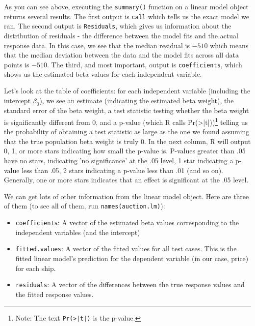 \documentclass{tufte-book}\usepackage[]{graphicx}\usepackage[]{color}
\begin{document}
\begin{footnotesize}
As you can see above, executing the \texttt{summary()} function on a linear model object returns several results. The first output is \texttt{call} which tells us the exact model we ran. The second output is \texttt{Residuals}, which gives us information about the distribution of residuals - the difference between the model fits and the actual response data. In this case, we see that the median residual is \ensuremath{-510} which means that the median deviation between the data and the model fits across all data points is \ensuremath{-510}. The third, and most important, output is \texttt{coefficients}, which shows us the estimated beta values for each independent variable.

Let's look at the table of coefficients: for each independent variable (including the intercept $\beta_0$), we see an estimate (indicating the estimated beta weight), the standard error of the beta weight, a test statistic testing whether the beta weight is significantly different from 0, and a p-value (which R calls Pr(>|t|))\footnote{Note: The text \texttt{Pr(>|t|)} is the p-value.} telling us the probability of obtaining a test statistic as large as the one we found assuming that the true population beta weight is truly 0. In the next column, R will output 0, 1, or more stars indicating how small the p-value is. P-values greater than .05 have no stars, indicating 'no significance' at the .05 level, 1 star indicating a p-value less than .05, 2 stars indicating a p-value less than .01 (and so on). Generally, one or more stars indicates that an effect is significant at the .05 level.


We can get lots of other information from the linear model object. Here are three of them (to see all of them, run \texttt{names(auction.lm)}):

\begin{itemize}

  \item \texttt{coefficients}: A vector of the estimated beta values corresponding to the independent variables (and the intercept)
  \item \texttt{fitted.values}: A vector of the fitted values for all test cases. This is the fitted linear model's prediction for the dependent variable (in our case, price) for each ship.
  \item \texttt{residuals}: A vector of the differences between the true response values and the fitted response values.

\end{itemize}


\end{footnotesize}
\end{document}
